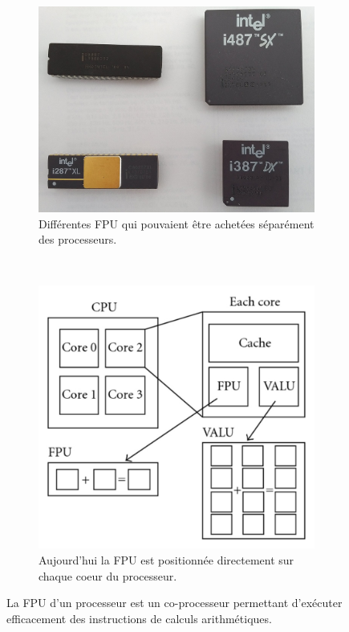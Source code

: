         

        \begin{figure}
            \centering
            \begin{subfigure}[b]{0.45\linewidth}
                \includegraphics[width=\linewidth]{images/cpu_fpu.jpg}
                \caption{Différentes FPU qui pouvaient être achetées séparément des processeurs.}
                \label{pic_cpu_fpu}
            \end{subfigure}
            ~ %
            \begin{subfigure}[b]{0.45\linewidth}
                \includegraphics[width=\linewidth]{images/cpu_fpu_recent.png}
                \caption{Aujourd'hui la FPU est positionnée directement sur chaque coeur du processeur.}
                \label{pic_cpu_fpu_recent}
            \end{subfigure}
            \caption{La FPU d'un processeur est un co-processeur permettant d'exécuter efficacement des instructions de calculs arithmétiques. }\label{fig:cacheinclusionpolicy}
        \end{figure}
        
